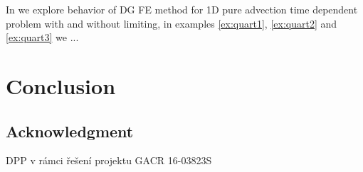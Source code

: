 \documentclass{book}
\theoremstyle{definition}
\numberwithin{equation}{section}
\numberwithin{table}{section}
\begin{document}
In  we explore behavior of DG FE method for 1D pure advection time 
dependent problem with and without limiting, in examples \ref{ex:quart1}, \ref{ex:quart2} 
and \ref{ex:quart3} we ...


\newpage

\newpage

\newpage

\newpage


\newpage

\newpage


\chapter{Conclusion}
\label{ch:conclusion}



\section*{Acknowledgment}
 DPP v rámci řešení projektu GACR 16-03823S







\begin{appendix}
	

	
\end{appendix}
\end{document}
